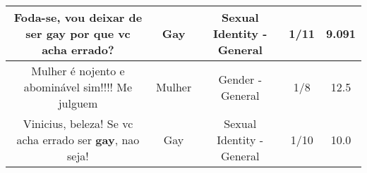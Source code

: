 \documentclass[11pt]{article}
\newlength\mylength
\begin{document}
\begin{center}
\begin{longtable}{|C{.65\mylength}|C{.30\mylength}|C{.12\mylength}|C{.12\mylength}|C{.12\mylength}|}
  \small Foda-se, vou deixar de ser \textbf{gay} por que vc acha errado?\normalsize   & Gay & Sexual Identity - General & 1/11 & 9.091 \\  \hline
  \small Mulher é nojento e abominável sim!!!! Me julguem\normalsize   & Mulher & Gender - General & 1/8 & 12.5 \\  \hline
  \small Vinicius, beleza! Se vc acha errado ser \textbf{gay}, nao seja!\normalsize   & Gay & Sexual Identity - General & 1/10 & 10.0 \\  \hline
  
\end{longtable}
\end{center}
\end{document}
